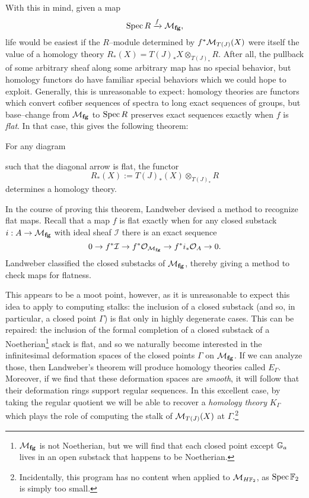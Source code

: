 With this in mind, given a map \[\operatorname{Spec} R \xrightarrow{f} \mathcal{M}_{\mathbf{fg}},\] life would be easiest if the $R$--module determined by $f^* \mathcal{M}_{T(J)}(X)$ were itself the value of a homology theory $R_*(X) = T(J)_* X \otimes_{T(J)_*} R$.  After all, the pullback of some arbitrary sheaf along some arbitrary map has no special behavior, but homology functors do have familiar special behaviors which we could hope to exploit.  Generally, this is unreasonable to expect: homology theories are functors which convert cofiber sequences of spectra to long exact sequences of groups, but base--change from $\mathcal{M}_{\mathbf{fg}}$ to $\operatorname{Spec} R$ preserves exact sequences exactly when $f$ is \textit{flat}.  In that case, this gives the following theorem:

\begin{theorem}
For any diagram
\begin{center}
\end{center}
such that the diagonal arrow is flat, the functor \[R_*(X) := T(J)_*(X) \otimes_{T(J)_*} R\] determines a homology theory. 
\end{theorem}

\noindent In the course of proving this theorem, Landweber devised a method to recognize flat maps.  Recall that a map $f$ is flat exactly when for any closed substack $i: A \to \mathcal{M}_{\mathbf{fg}}$ with ideal sheaf $\mathcal I$ there is an exact sequence \[0 \to f^* \mathcal I \to f^* \mathcal O_{\mathcal{M}_{\mathbf{fg}}} \to f^* i_* \mathcal O_A \to 0.\]  Landweber classified the closed substacks of $\mathcal{M}_{\mathbf{fg}}$, thereby giving a method to check maps for flatness.

This appears to be a moot point, however, as it is unreasonable to expect this idea to apply to computing stalks: the inclusion of a closed substack (and so, in particular, a closed point $\Gamma$) is flat only in highly degenerate cases.  This can be repaired: the inclusion of the formal completion of a closed substack of a Noetherian\footnote{$\mathcal{M}_{\mathbf{fg}}$ is not Noetherian, but we will find that each closed point except $\mathbb G_a$ lives in an open substack that happens to be Noetherian.} stack is flat, and so we naturally become interested in the infinitesimal deformation spaces of the closed points $\Gamma$ on $\mathcal{M}_{\mathbf{fg}}$.  If we can analyze those, then Landweber's theorem will produce homology theories called $E_\Gamma$.  Moreover, if we find that these deformation spaces are \emph{smooth}, it will follow that their deformation rings support regular sequences.  In this excellent case, by taking the regular quotient we will be able to recover a \emph{homology theory} $K_\Gamma$ which plays the role of computing the stalk of $\mathcal{M}_{T(J)}(X)$ at $\Gamma$.\footnote{Incidentally, this program has no content when applied to $\mathcal{M}_{H\mathbb F_2}$, as $\operatorname{Spec} \mathbb F_2$ is simply too small.}


